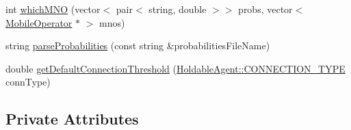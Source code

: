 \begin{DoxyCompactItemize}
\item 
int \mbox{\hyperlink{class_world_adf473b1600b41a11c7ef1f0251abb5b7}{which\+M\+NO}} (vector$<$ pair$<$ string, double $>$$>$ probs, vector$<$ \mbox{\hyperlink{class_mobile_operator}{Mobile\+Operator}} $\ast$ $>$ mnos)
\item 
string \mbox{\hyperlink{class_world_a5675c3a896891827dd59255a9761f08e}{parse\+Probabilities}} (const string \&probabilities\+File\+Name)
\item 
double \mbox{\hyperlink{class_world_a5975f2673e84c87f8640737efd04590b}{get\+Default\+Connection\+Threshold}} (\mbox{\hyperlink{class_holdable_agent_ae2c334b004d7b9c5a999cf2618e4e518}{Holdable\+Agent\+::\+C\+O\+N\+N\+E\+C\+T\+I\+O\+N\+\_\+\+T\+Y\+PE}} conn\+Type)
\end{DoxyCompactItemize}
\subsection*{Private Attributes}
